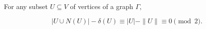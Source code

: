 For any subset $U \subseteq V$ of vertices of a graph $\Gamma$,

$$|U \cup N(U)| - \delta(U) \equiv |U| - \|U\| \equiv 0 \pmod{2}.$$
